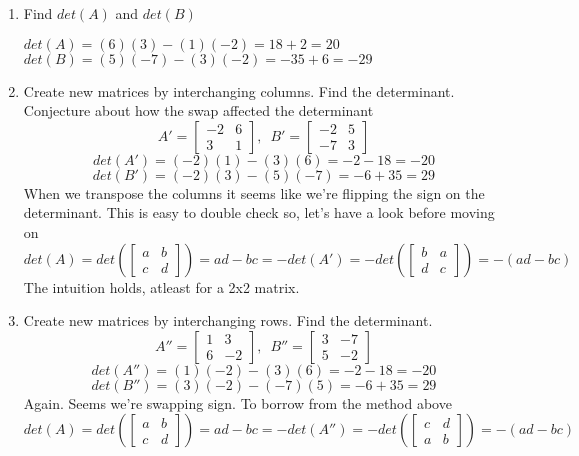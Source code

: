 \documentclass{article}
\begin{document}
            \begin{enumerate}[label=(\alph*)]
                \item Find $det(A)$ and $det(B)$
                    \begin{center}
                        $det(A)=(6)(3)-(1)(-2)=18+2=20$ \\
                        $det(B)=(5)(-7)-(3)(-2)=-35+6=-29$
                    \end{center}
                \item Create new matrices by interchanging columns. Find the determinant.
                      Conjecture about how the swap affected the determinant
                        \[A'=\begin{bmatrix}-2&6\\3&1\end{bmatrix},\enspace B'=\begin{bmatrix}-2&5\\-7&3\end{bmatrix}\]
                        \[det(A')=(-2)(1)-(3)(6)=-2-18=-20\]
                        \[det(B')=(-2)(3)-(5)(-7)=-6+35=29\]
                      When we transpose the columns it seems like we're flipping the sign on the determinant.
                      This is easy to double check so, let's have a look before moving on
                        \[det(A)=det\left(\begin{bmatrix}a&b\\c&d\end{bmatrix}\right)=ad-bc=-det(A')=-det(\begin{bmatrix}b&a\\d&c\end{bmatrix})=-(ad-bc)\]
                      The intuition holds, atleast for a 2x2 matrix.
                \item Create new matrices by interchanging rows. Find the determinant. 
                        \[A''=\begin{bmatrix}1&3\\6&-2\end{bmatrix},\enspace B''=\begin{bmatrix}3&-7\\5&-2\end{bmatrix}\]
                        \[det(A'')=(1)(-2)-(3)(6)=-2-18=-20\]
                        \[det(B'')=(3)(-2)-(-7)(5)=-6+35=29\]
                      Again. Seems we're swapping sign. To borrow from the method above
                        \[det(A)=det(\begin{bmatrix}a&b\\c&d\end{bmatrix})=ad-bc=-det(A'')=-det(\begin{bmatrix}c&d\\a&b\end{bmatrix})=-(ad-bc)\]

\end{enumerate}
\end{document}
